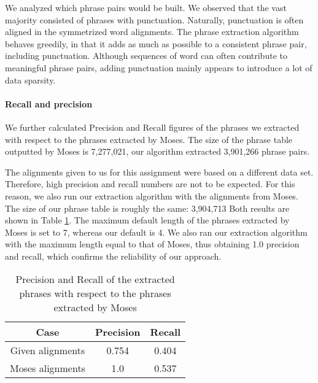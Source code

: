 \documentclass[11pt]{article}
\begin{document}
We analyzed which phrase pairs would be built. We observed that the vast majority consisted of phrases with punctuation. Naturally, punctuation is often aligned in the symmetrized word alignments. The phrase extraction algorithm behaves greedily, in that it adds as much as possible to a consistent phrase pair, including punctuation. Although sequences of word can often contribute to meaningful phrase pairs, adding punctuation mainly appears to introduce a lot of data sparsity. 


\paragraph{Recall and precision}
We further calculated Precision and Recall figures of the phrases we extracted with respect to the phrases extracted by Moses. 
The size of the phrase table outputted by Moses is 7,277,021, our algorithm extracted 3,901,266 phrase pairs. 

The alignments given to us for this assignment were based on a different data set. Therefore, high precision and recall numbers are not to be expected. For this reason, we also run our extraction algorithm with the alignments from Moses. 
The size of our phrase table is roughly the same: 3,904,713
Both results are shown in Table \ref{PR}.
The maximum default length of the phrases extracted by Moses is set to 7, whereas our default is 4. 
We also ran our extraction algorithm with the maximum length equal to that of Moses, thus obtaining 1.0 precision and recall, which confirms the reliability of our approach.

\begin{table}[h]
\centering
\begin{tabular}{ c c c}
  \hline \hline
  \textbf{Case} & \textbf{Precision} & \textbf{Recall} \\
  \hline \hline
  Given alignments &  0.754 & 0.404\\
  Moses alignments& 1.0 & 0.537 \\
  \hline
\end{tabular}
\caption{Precision and Recall of the extracted phrases with respect to the phrases extracted by Moses}
\label{PR}
\end{table}

\end{document}
